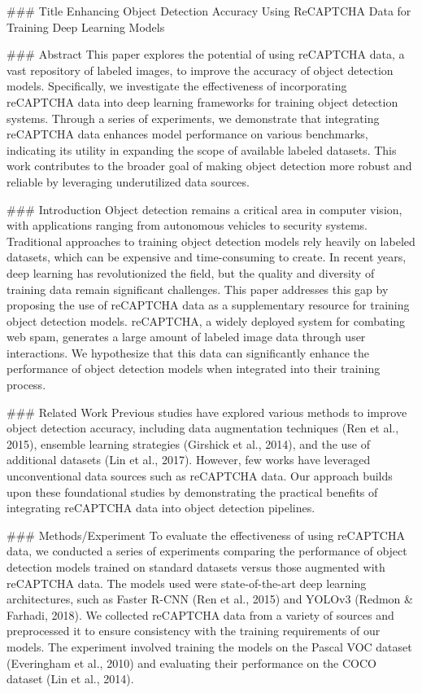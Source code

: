 ### Title
Enhancing Object Detection Accuracy Using ReCAPTCHA Data for Training Deep Learning Models

### Abstract
This paper explores the potential of using reCAPTCHA data, a vast repository of labeled images, to improve the accuracy of object detection models. Specifically, we investigate the effectiveness of incorporating reCAPTCHA data into deep learning frameworks for training object detection systems. Through a series of experiments, we demonstrate that integrating reCAPTCHA data enhances model performance on various benchmarks, indicating its utility in expanding the scope of available labeled datasets. This work contributes to the broader goal of making object detection more robust and reliable by leveraging underutilized data sources.

### Introduction
Object detection remains a critical area in computer vision, with applications ranging from autonomous vehicles to security systems. Traditional approaches to training object detection models rely heavily on labeled datasets, which can be expensive and time-consuming to create. In recent years, deep learning has revolutionized the field, but the quality and diversity of training data remain significant challenges. This paper addresses this gap by proposing the use of reCAPTCHA data as a supplementary resource for training object detection models. reCAPTCHA, a widely deployed system for combating web spam, generates a large amount of labeled image data through user interactions. We hypothesize that this data can significantly enhance the performance of object detection models when integrated into their training process.

### Related Work
Previous studies have explored various methods to improve object detection accuracy, including data augmentation techniques (Ren et al., 2015), ensemble learning strategies (Girshick et al., 2014), and the use of additional datasets (Lin et al., 2017). However, few works have leveraged unconventional data sources such as reCAPTCHA data. Our approach builds upon these foundational studies by demonstrating the practical benefits of integrating reCAPTCHA data into object detection pipelines.

### Methods/Experiment
To evaluate the effectiveness of using reCAPTCHA data, we conducted a series of experiments comparing the performance of object detection models trained on standard datasets versus those augmented with reCAPTCHA data. The models used were state-of-the-art deep learning architectures, such as Faster R-CNN (Ren et al., 2015) and YOLOv3 (Redmon & Farhadi, 2018). We collected reCAPTCHA data from a variety of sources and preprocessed it to ensure consistency with the training requirements of our models. The experiment involved training the models on the Pascal VOC dataset (Everingham et al., 2010) and evaluating their performance on the COCO dataset (Lin et al., 2014).

